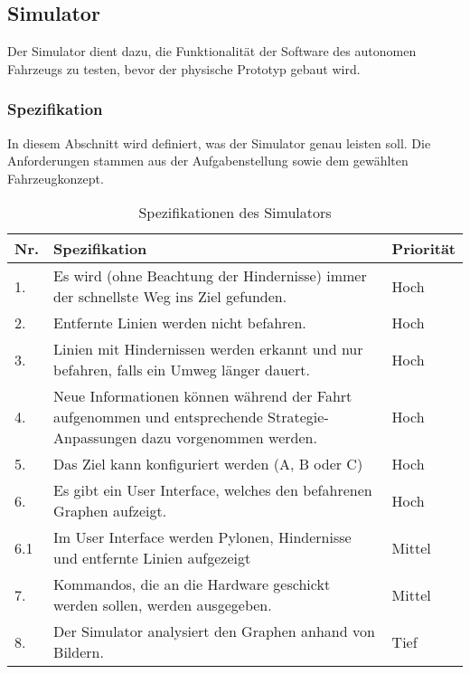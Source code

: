 \documentclass[../main.tex]{subfiles}
\begin{document}
\newpage
\subsection{Simulator}\label{simulator}

Der Simulator dient dazu, die Funktionalität der Software des autonomen Fahrzeugs zu testen, bevor der physische Prototyp gebaut wird.\\

\subsubsection{Spezifikation}

In diesem Abschnitt wird definiert, was der Simulator genau leisten soll. Die Anforderungen stammen aus der Aufgabenstellung sowie dem gewählten Fahrzeugkonzept.

\begin{table}[htbp!]
    \centering
    \begin{tabularx}{\textwidth}{| l | X | l |}
        \hline
        \textbf{Nr.} & \textbf{Spezifikation} & \textbf{Priorität} \\ \hline
        1. & Es wird (ohne Beachtung der Hindernisse) immer der schnellste Weg ins Ziel gefunden. & Hoch \\ \hline
        2. & Entfernte Linien werden nicht befahren. & Hoch \\ \hline
        3. & Linien mit Hindernissen werden erkannt und nur befahren, falls ein Umweg länger dauert. & Hoch \\ \hline
        4. & Neue Informationen können während der Fahrt aufgenommen und entsprechende Strategie-Anpassungen dazu vorgenommen werden. & Hoch \\ \hline
        5. & Das Ziel kann konfiguriert werden (A, B oder C) & Hoch \\ \hline
        6. & Es gibt ein User Interface, welches den befahrenen Graphen aufzeigt. & Hoch \\ \hline
        6.1 & Im User Interface werden Pylonen, Hindernisse und entfernte Linien aufgezeigt & Mittel \\ \hline
        7. & Kommandos, die an die Hardware geschickt werden sollen, werden ausgegeben. & Mittel \\ \hline
        8. & Der Simulator analysiert den Graphen anhand von Bildern. & Tief \\ \hline
    \end{tabularx}
    \caption{Spezifikationen des Simulators}
\end{table}
\end{document}
